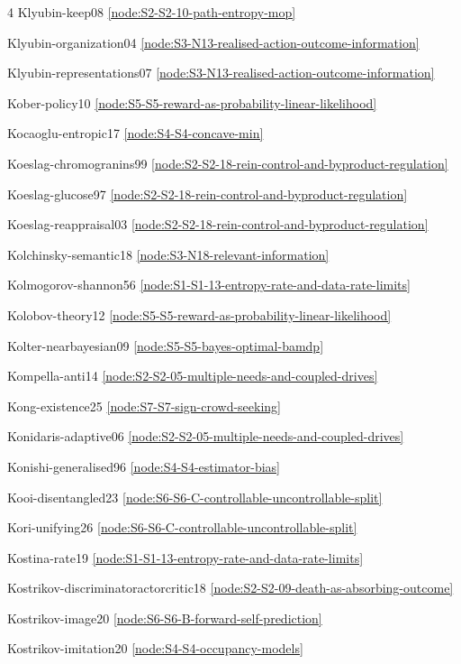 \documentclass[10pt]{article}
\begin{document}
{\begin{multicols}{4}
Klyubin-keep08 \hfill \ref{node:S2-S2-10-path-entropy-mop}\par
Klyubin-organization04 \hfill \ref{node:S3-N13-realised-action-outcome-information}\par
Klyubin-representations07 \hfill \ref{node:S3-N13-realised-action-outcome-information}\par
Kober-policy10 \hfill \ref{node:S5-S5-reward-as-probability-linear-likelihood}\par
Kocaoglu-entropic17 \hfill \ref{node:S4-S4-concave-min}\par
Koeslag-chromogranins99 \hfill \ref{node:S2-S2-18-rein-control-and-byproduct-regulation}\par
Koeslag-glucose97 \hfill \ref{node:S2-S2-18-rein-control-and-byproduct-regulation}\par
Koeslag-reappraisal03 \hfill \ref{node:S2-S2-18-rein-control-and-byproduct-regulation}\par
Kolchinsky-semantic18 \hfill \ref{node:S3-N18-relevant-information}\par
Kolmogorov-shannon56 \hfill \ref{node:S1-S1-13-entropy-rate-and-data-rate-limits}\par
Kolobov-theory12 \hfill \ref{node:S5-S5-reward-as-probability-linear-likelihood}\par
Kolter-nearbayesian09 \hfill \ref{node:S5-S5-bayes-optimal-bamdp}\par
Kompella-anti14 \hfill \ref{node:S2-S2-05-multiple-needs-and-coupled-drives}\par
Kong-existence25 \hfill \ref{node:S7-S7-sign-crowd-seeking}\par
Konidaris-adaptive06 \hfill \ref{node:S2-S2-05-multiple-needs-and-coupled-drives}\par
Konishi-generalised96 \hfill \ref{node:S4-S4-estimator-bias}\par
Kooi-disentangled23 \hfill \ref{node:S6-S6-C-controllable-uncontrollable-split}\par
Kori-unifying26 \hfill \ref{node:S6-S6-C-controllable-uncontrollable-split}\par
Kostina-rate19 \hfill \ref{node:S1-S1-13-entropy-rate-and-data-rate-limits}\par
Kostrikov-discriminatoractorcritic18 \hfill \ref{node:S2-S2-09-death-as-absorbing-outcome}\par
Kostrikov-image20 \hfill \ref{node:S6-S6-B-forward-self-prediction}\par
Kostrikov-imitation20 \hfill \ref{node:S4-S4-occupancy-models}\par

\end{multicols}}
\end{document}
